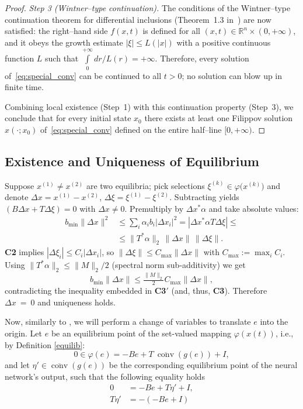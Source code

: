 \documentclass[journal]{IEEEtran}
\theoremstyle{myplain}
\begin{document}
\begin{proof}
\emph{Step 3 (Wintner–type continuation).}
The conditions of the Wintner–type continuation theorem for
differential inclusions (Theorem~1.3 in~\cite[Ch.~1]{YLG}) are now
satisfied: the right–hand side $f(x,t)$ is defined for all
$(x,t)\in\mathbb{R}^n\times(0,+\infty)$, and it obeys the growth
estimate $|\xi|\le L(|x|)$ with a positive continuous function $L$
such that $\int\limits_0^{+\infty}dr/L(r)=+\infty$.
Therefore, every solution of~\eqref{eq:special_conv} can be continued to
all $t>0$; no solution can blow up in finite time.

Combining local existence (Step~1) with this continuation property
(Step~3), we conclude that for every initial state $x_0$ there exists
at least one Filippov solution $x(\cdot;x_0)$ of~\eqref{eq:special_conv}
defined on the entire half–line $[0,+\infty)$.
\end{proof}

\subsection{Existence and Uniqueness of Equilibrium}
Suppose $x^{(1)}\neq x^{(2)}$ are two equilibria; pick selections
$\xi^{(k)}\in\varphi\bigl(x^{(k)}\bigr)$ and denote
$\Delta x=x^{(1)}-x^{(2)}$, $\Delta\xi=\xi^{(1)}-\xi^{(2)}$.  
Subtracting yields
$(B\Delta x+T\Delta\xi)=0$ with $\Delta x\neq0$.  
Premultiply by
$\Delta x^{\!*}\alpha$ and take absolute values:
\begin{equation}\label{eq:uniq}
\begin{aligned}
    b_{\min}\|\Delta x\|^{2}
  &\leqslant \sum_{i}\alpha_i b_i|\Delta x_i|^{2}
  = |\Delta x^{\!*}\alpha T\Delta\xi| \leqslant \\
  &
  \leqslant \|T^{\!*}\alpha\|_{2}\,\|\Delta x\|\,\|\Delta\xi\|.
\end{aligned}
\end{equation}
\textbf{C2} implies $|\Delta\xi_i|\leqslant C_i|\Delta x_i|$, so
\(\|\Delta\xi\|\leqslant C_{\max}\|\Delta x\|\) with $C_{\max}:=\max_i C_i$.
Using $\|T^{\!*}\alpha\|_{2}\leqslant \|M\|_{2}/2$ (spectral norm sub‑additivity)
we get
\[
  b_{\min}\|\Delta x\|\leqslant \tfrac{\|M\|_{2}}{2}C_{\max}\|\Delta x\|,
\]
contradicting the inequality embedded in \textbf{C3$'$} (and, thus, \textbf{C3}). 
Therefore $\Delta x~=~0$ and
uniqueness holds.

Now, similarly to \cite{p1}, we will perform a change of variables to translate $e$ into the origin. Let $e$ be an equilibrium point of the set-valued mapping $\varphi(x(t))$, i.e., by Definition \ref{equilib}:
\[
0 \in \varphi(e)=-Be+T~\overline{\operatorname{conv}}(g(e))+I ,
\]
and let $\eta' \in \overline{\operatorname{conv}}(g(e))$ be the corresponding equilibrium point of the neural network's output, such that the following equality holds
\begin{equation}\label{eq:outputequilib}
    \begin{aligned}
0 &= -Be + T \eta'+ I,\\
T \eta' &= -(-Be+I)
    \end{aligned}
\end{equation}
\end{document}
